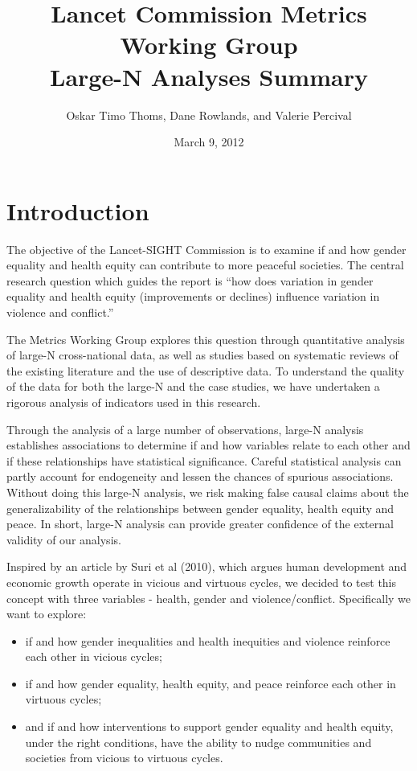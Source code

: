\documentclass[12pt]{article}
\author{Oskar Timo Thoms, Dane Rowlands, and Valerie Percival}
\title{Lancet Commission Metrics Working Group\\Large-N Analyses Summary}
\date{March 9, 2012}
\begin{document}
\maketitle
\tableofcontents

\section{Introduction}

The objective of the Lancet-SIGHT Commission is to examine if and how gender equality and health equity can contribute to more peaceful societies.
The central research question which guides the report is \enquote{how does variation in gender equality and health equity (improvements or declines) influence variation in violence and conflict.}

The Metrics Working Group explores this question through quantitative analysis of large-N cross-national data, as well as studies based on systematic reviews of the existing literature and the use of descriptive data. To understand the quality of the data for both the large-N and the case studies, we have undertaken a rigorous analysis of indicators used in this research.

Through the analysis of a large number of observations, large-N analysis establishes associations to determine if and how variables relate to each other and if these relationships have statistical significance. Careful statistical analysis can partly account for endogeneity and lessen the chances of spurious associations. Without doing this large-N analysis, we risk making false causal claims about the generalizability of the relationships between gender equality, health equity and peace. In short, large-N analysis can provide greater confidence of the external validity of our analysis.

Inspired by an article by Suri et al (2010), which argues human development and economic growth operate in vicious and virtuous cycles, we decided to test this concept with three variables - health, gender and violence/conflict. Specifically we want to explore:
\begin{itemize}
\item if and how gender inequalities and health inequities and violence reinforce each other in vicious cycles;
\item if and how gender equality, health equity, and peace reinforce each other in virtuous cycles;
\item and if and how interventions to support gender equality and health equity, under the right conditions, have the ability to nudge communities and societies from vicious to virtuous cycles.
\end{itemize}
\end{document}
